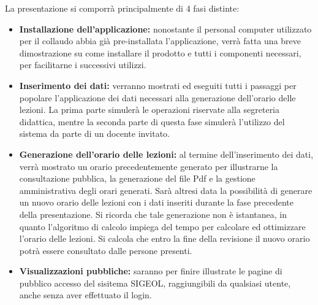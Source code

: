 \documentclass[11pt,a4paper]{article}
\begin{document}
La presentazione si comporrà principalmente di 4 fasi distinte:
\begin{itemize}
 \item \textbf{Installazione dell'applicazione:} nonostante il personal computer utilizzato per il collaudo abbia già pre-installata l'applicazione, verrà fatta una breve dimostrazione su come installare il prodotto e tutti i componenti necessari, per facilitarne i successivi utilizzi.
 \item \textbf{Inserimento dei dati:} verranno mostrati ed eseguiti tutti i passaggi per popolare l'applicazione dei dati necessari alla generazione dell'orario delle lezioni. La prima parte simulerà le operazioni riservate alla segreteria didattica, mentre la seconda parte di questa fase simulerà l'utilizzo del sistema da parte di un docente invitato.
 \item \textbf{Generazione dell'orario delle lezioni:} al termine dell'inserimento dei dati, verrà mostrato un orario precedentemente generato per illustrarne la consultazione pubblica, la generazione del file Pdf e la gestione amministrativa degli orari generati. Sarà altresi data la possibilità di generare un nuovo orario delle lezioni con i dati inseriti durante la fase precedente della presentazione. Si ricorda che tale genera\-zione non è istantanea, in quanto l'algoritmo di calcolo impiega del tempo per calcolare ed ottimizzare l'orario delle lezioni. Si calcola che entro la fine della revisione il nuovo orario potrà essere consultato dalle persone presenti.
 \item \textbf{Visualizzazioni pubbliche:} saranno per finire illustrate le pagine di pubblico accesso del sisitema SIGEOL, raggiungibili da qualsiasi utente, anche senza aver effettuato il login. 
\end{itemize}
\end{document}
